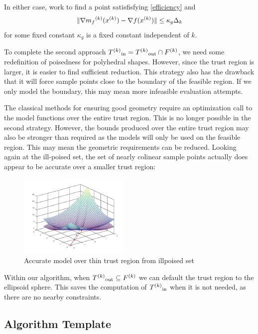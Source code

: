 In either case, work to find a point satisfisfying \ref{efficiency} and 
\begin{equation}
\label{accuracy}
\|\nabla {{m}_f}^{(k)}({x}^{(k)}) - \nabla f({x}^{(k)}) \| \le \kappa_g \Delta_k
\end{equation}
 for some fixed constant $\kappa_g$ is a fixed constant independent of $k$.

 

To complete the second approach ${T^{(k)}}_{\text{in}} = {T^{(k)}}_{\text{out}} \cap {F}^{(k)}$, we need some redefinition of poisedness for polyhedral shapes.
However, since the trust region is larger, it is easier to find sufficient reduction.
This strategy also has the drawback that it will force sample points close to the boundary of the feasible region.
If we only model the boundary, this may mean more infeasible evaluation attempts.

The classical methods for ensuring good geometry require an optimization call to the model functions over the entire trust region.
This is no longer possible in the second strategy.
However, the bounds produced over the entire trust region may also be stronger than required as the models will only be used on the feasible region.
This may mean the geometric requirements can be reduced.
Looking again at the ill-poised set, the set of nearly colinear sample points actually does appear to be accurate over a smaller trust region:


\begin{figure}[h]
    \centering
    \includegraphics[width=200px]{images/poised_bad_but_good.png}
    \caption{Accurate model over thin trust region from illpoised set}
    \label{aoip}
\end{figure}


Within our algorithm, when $ {T^{(k)}}_{\text{out}} \subseteq {F}^{(k)}$ we can default the trust region to the ellipsoid sphere.
This saves the computation of ${T^{(k)}}_{\text{in}}$ when it is not needed, as there are no nearby constraints.

\subsection{Algorithm Template}

